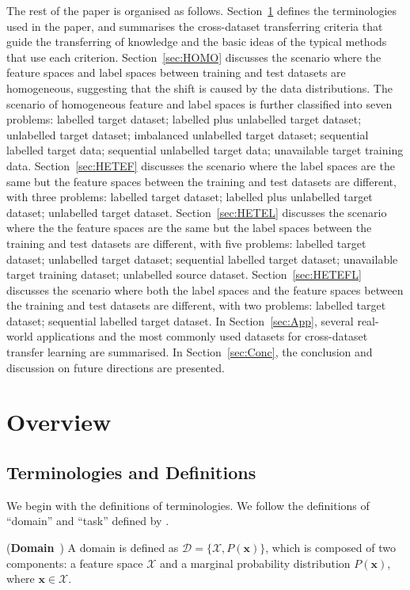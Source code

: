 \documentclass[prodmode]{acmsmall}  %
\begin{document}
The rest of the paper is organised as follows. 
Section~\ref{sec:overview} defines the terminologies used in the paper, and summarises the cross-dataset transferring criteria that guide the transferring of knowledge and the basic ideas of the typical methods that use each criterion. 
Section~\ref{sec:HOMO} discusses the scenario where the feature spaces and label spaces between training and test datasets are homogeneous, suggesting that the shift is caused by the data distributions. The scenario of homogeneous feature and label spaces is further classified into seven problems: labelled target dataset; labelled plus unlabelled target dataset; unlabelled target dataset; imbalanced unlabelled target dataset; sequential labelled target data; sequential unlabelled target data; unavailable target training data. Section~\ref{sec:HETEF} discusses the scenario where the label spaces are the same but the feature spaces between the training and test datasets are different, with three problems: labelled target dataset; labelled plus unlabelled target dataset; unlabelled target dataset. Section~\ref{sec:HETEL} discusses the scenario where the the feature spaces are the same but the label spaces between the training and test datasets are different, with five problems: labelled target dataset; unlabelled target dataset; sequential labelled target dataset; unavailable target training dataset; unlabelled source dataset. Section~\ref{sec:HETEFL} discusses the scenario where both the label spaces and the feature spaces between the training and test datasets are different, with two problems: labelled target dataset; sequential labelled target dataset. In Section~\ref{sec:App}, several real-world applications and the most commonly used datasets for cross-dataset transfer learning are summarised. In Section~\ref{sec:Conc}, the conclusion and discussion on future directions are presented.

\section{Overview}
\label{sec:overview}
\subsection{Terminologies and Definitions}
\label{sec:term} 
We begin with the definitions of terminologies. We follow the definitions of ``domain'' and ``task'' defined by .

\begin{definition}(\textbf{Domain}~\cite{Pan2010}) A domain is defined as $\mathcal{D}=\{\mathcal{X},P(\mathbf{x})\}$, which is composed of two components: a feature space $\mathcal{X}$ and a marginal probability distribution $P(\mathbf{x})$, where $\mathbf{x}\in{\mathcal{X}}$.  
\end{definition}
\end{document}
